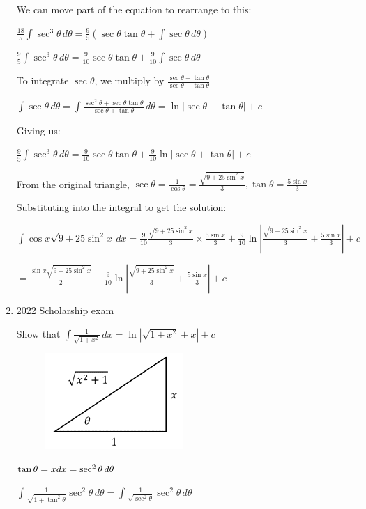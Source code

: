 \documentclass[../main.tex]{subfiles}
\begin{document}
\begin{enumerate}
    We can move part of the equation to rearrange to this:

    \(\frac{18}{5}\int \sec^3{\theta}\,d\theta=\frac{9}{5}(\sec{\theta}\tan{\theta} +\int \sec{\theta}\,d\theta)\)

    \(\frac{9}{5}\int \sec^3{\theta}\,d\theta=\frac{9}{10}\sec{\theta}\tan{\theta} +\frac{9}{10}\int \sec{\theta}\,d\theta\)

    To integrate \(\sec{\theta}\), we multiply by \(\frac{\sec{\theta}+\tan{\theta}}{\sec{\theta}+\tan{\theta}}\)

    \(\int \sec{\theta}\,d\theta=\int \frac{\sec^2{\theta}+\sec{\theta}\tan{\theta}}{\sec{\theta}+\tan{\theta}}\,d\theta=\ln{|\sec{\theta}+\tan{\theta}|}+c\)

    Giving us:

    \(\frac{9}{5}\int \sec^3{\theta}\,d\theta=\frac{9}{10}\sec{\theta}\tan{\theta}+\frac{9}{10}\ln{|\sec{\theta}+\tan{\theta}|}+c\)

    From the original triangle, \(\sec{\theta}=\frac{1}{\cos{\theta}}=\frac{\sqrt{9+25\sin^2{x}}}{3}, \tan{\theta}=\frac{5\sin{x}}{3}\)

    Substituting into the integral to get the solution:

    \(\int \cos{x}\sqrt{9+25\sin^2{x}}\,dx=\frac{9}{10}\frac{\sqrt{9+25\sin^2{x}}}{3}\times \frac{5\sin{x}}{3}+\frac{9}{10}\ln{|\frac{\sqrt{9+25\sin^2{x}}}{3}+\frac{5\sin{x}}{3}|+c}\)

    \(=\frac{\sin{x}\sqrt{9+25\sin^2{x}}}{2}+\frac{9}{10}\ln{|\frac{\sqrt{9+25\sin^2{x}}}{3}+\frac{5\sin{x}}{3}|+c}\)
    \pagebreak
    \item 2022 Scholarship exam
    
    Show that \(\int \frac{1}{\sqrt{1+x^2}}\,dx=\ln{|\sqrt{1+x^2}+x|}+c\)
    \begin{figure}[h]
        \includegraphics{images/trigsuba12.png}
    \end{figure}

    \(\tan{\theta}=x\\
    dx=\sec^2{\theta}\,d\theta\)

    \(\int \frac{1}{\sqrt{1+\tan^2{\theta}}}\sec^2{\theta}\,d\theta=\int \frac{1}{\sqrt{\sec^2{\theta}}}\sec^2{\theta}\,d\theta\)


\end{enumerate}
\end{document}
